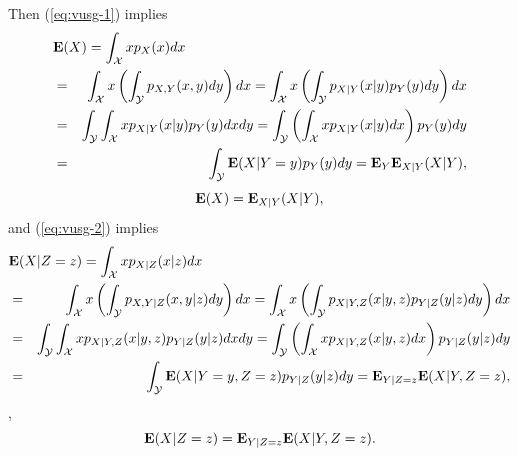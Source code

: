 Then (\ref{eq:vusg-1}) implies
\begin{eqnarray*}
\lefteqn{
\Expect(X)
= \int_\suppx x p_X(x) dx
}
\\
&=& \int_\suppx x \left(\int_\suppy p_{X,Y}(x,y) dy \right) dx
= \int_\suppx x \left(\int_\suppy p_{X|Y}(x|y)p_Y(y) dy \right) dx
\\
&=& \int_\suppy \int_\suppx x p_{X|Y}(x|y)p_Y(y) dx dy
= \int_\suppy \left( \int_\suppx x p_{X|Y}(x|y) dx \right) p_Y(y) dy
\\
&=& \int_\suppy \Expect (X|Y=y) p_Y(y) dy
= \Expect_Y \Expect_{X|Y} (X|Y),
\end{eqnarray*}
\begin{equation}
\mathbf{E}(X) = \mathbf{E}_{X|Y} (X|Y),
\end{equation}
and (\ref{eq:vusg-2}) implies
\begin{eqnarray*}
\lefteqn{
\Expect(X|Z=z)
= \int_\suppx x p_{X|Z}(x|z) dx
}
\\
&=& \int_\suppx x \left(\int_{\suppy} p_{X,Y|Z}(x,y|z) dy \right) dx
= \int_\suppx x \left(\int_{\suppy} p_{X|Y,Z}(x|y,z) p_{Y|Z}(y|z) dy \right) dx
\\
&=& \int_\suppy \int_\suppx x p_{X|Y,Z}(x|y,z) p_{Y|Z}(y|z) dx dy
= \int_\suppy \left( \int_\suppx x p_{X|Y,Z}(x|y,z) dx \right) p_{Y|Z}(y|z) dy
\\
&=& \int_\suppy \Expect(X|Y=y,Z=z) p_{Y|Z}(y|z) dy
= \Expect_{Y|Z=z} \Expect(X|Y,Z=z),
\end{eqnarray*}
\ie,
\begin{equation}
\label{eq:dkci}
\mathbf{E}(X|Z=z)
= \mathbf{E}_{Y|Z=z} \mathbf{E}(X|Y,Z=z).
\end{equation}
